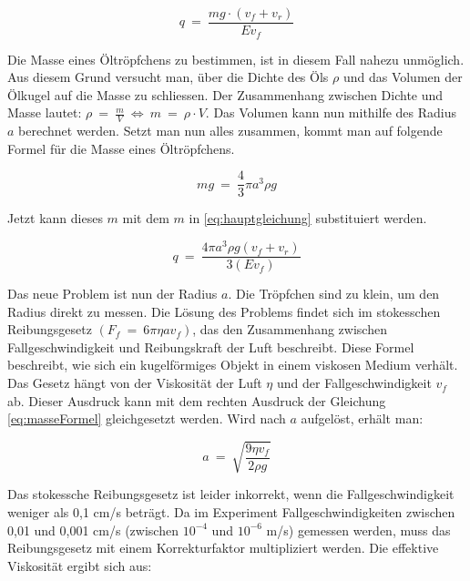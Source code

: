 \begin{equation}\label{eq:hauptgleichung}
	q \ = \ \frac{mg \cdot (v_f + v_r)}{Ev_f}
\end{equation}

\noindent Die Masse eines Öltröpfchens zu bestimmen, ist in diesem Fall nahezu unmöglich. Aus diesem Grund versucht man, über die Dichte des Öls $\rho$ und das Volumen der Ölkugel auf die Masse zu schliessen. Der Zusammenhang zwischen Dichte und Masse lautet: $\rho \ = \ \frac{m}{V} \ \Leftrightarrow \ m \ = \ \rho \cdot V$. Das Volumen kann nun mithilfe des Radius $a$ berechnet werden. Setzt man nun alles zusammen, kommt man auf folgende Formel für die Masse eines Öltröpfchens. 

\begin{equation}\label{eq:masseFormel}
	mg \ = \ \frac{4}{3} \pi a^3 \rho g
\end{equation}

\noindent Jetzt kann dieses $m$ mit dem $m$ in \autoref{eq:hauptgleichung} substituiert werden.

\begin{equation}\label{eq:ladungFormel}
	q \ = \ \frac{4\pi a^3\rho g (v_f + v_r)}{3(Ev_f)}
\end{equation}

\noindent Das neue Problem ist nun der Radius $a$. Die Tröpfchen sind zu klein, um den Radius direkt zu messen. Die Lösung des Problems findet sich im stokesschen Reibungsgesetz $(F_f \ = \ 6\pi \eta a v_f)$, das den Zusammenhang zwischen Fallgeschwindigkeit und Reibungskraft der Luft beschreibt. Diese Formel beschreibt, wie sich ein kugelförmiges Objekt in einem viskosen Medium verhält. Das Gesetz hängt von der Viskosität der Luft $\eta$ und der Fallgeschwindigkeit $v_f$ ab. Dieser Ausdruck kann mit dem rechten Ausdruck der Gleichung \ref{eq:masseFormel} gleichgesetzt werden. Wird nach $a$ aufgelöst, erhält man:

\begin{equation}\label{eq:stokesRadius}
	a \ = \ \sqrt{\frac{9\eta v_f}{2\rho g}}
\end{equation}

\noindent Das stokessche Reibungsgesetz ist leider inkorrekt, wenn die Fallgeschwindigkeit weniger als 0,1 cm/s beträgt. Da im Experiment Fallgeschwindigkeiten zwischen 0,01 und 0,001 cm/s (zwischen $10^{-4}$ und $10^{-6}$ m/s) gemessen werden, muss das Reibungsgesetz mit einem Korrekturfaktor multipliziert werden. Die effektive Viskosität ergibt sich aus:


